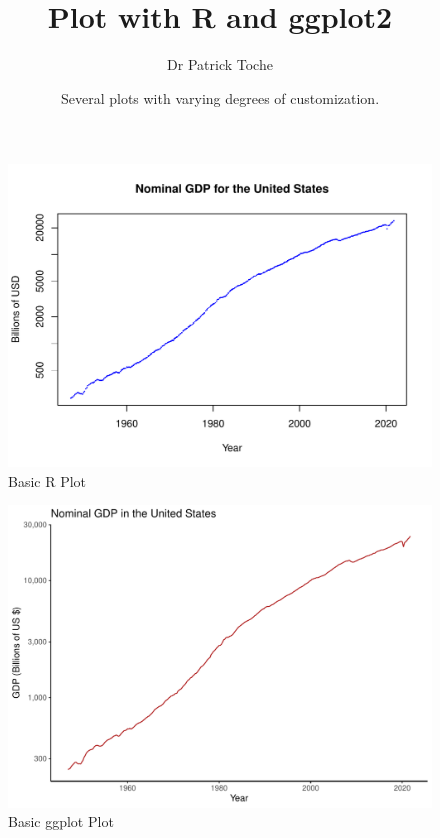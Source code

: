 \documentclass[12pt]{article}
\author{Dr Patrick Toche}
\title{Plot with R and ggplot2}
\date{Several plots with varying degrees of customization.}
\begin{document}
\maketitle

\begin{figure}[!htb]
\includegraphics[height=0.4\textheight]{plot-gdp-nominal-logscale-basic}
\caption*{Basic R Plot}
\end{figure}

\begin{figure}[!htb]
\includegraphics[height=0.4\textheight]{plot-gdp-nominal-logscale-ggplot}
\caption*{Basic ggplot Plot}
\end{figure}
\end{document}

